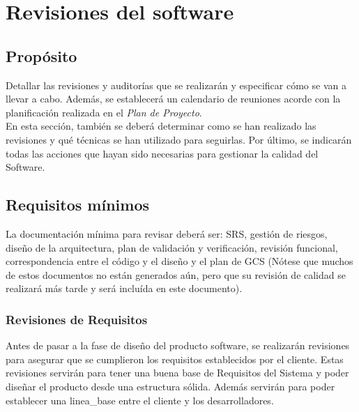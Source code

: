 \documentclass[11pt, a4paper, twoside, titlepage]{article}
\begin{document}
	\section{Revisiones del software} %

		\subsection{Propósito}
			Detallar las revisiones y auditorías que se realizarán y especificar cómo se van a llevar a cabo. Además, se establecerá un calendario de reuniones acorde con la planificación realizada en el \textit{Plan de Proyecto}. \\
			
			En esta sección, también se deberá determinar como se han realizado las revisiones y qué técnicas se han utilizado para seguirlas. Por último, se indicarán todas las acciones que hayan sido necesarias para gestionar la calidad del Software.

		\subsection{Requisitos mínimos}
			La documentación mínima para revisar deberá ser: SRS, gestión de riesgos, diseño de la arquitectura, plan de validación y verificación, revisión funcional, correspondencia entre el código y el diseño y el plan de GCS (Nótese que muchos de estos documentos no están generados aún, pero que su revisión de calidad se realizará más tarde y será incluída en este documento).
			\subsubsection{Revisiones de Requisitos}
				Antes de pasar a la fase de diseño del producto software, se realizarán revisiones para asegurar que se cumplieron los requisitos establecidos por el cliente. Estas revisiones servirán para tener una buena base de Requisitos del Sistema y poder diseñar el producto desde una estructura sólida.
 Además servirán para poder establecer una \gls{linea_base} entre el cliente y los desarrolladores. 
				
\end{document}
